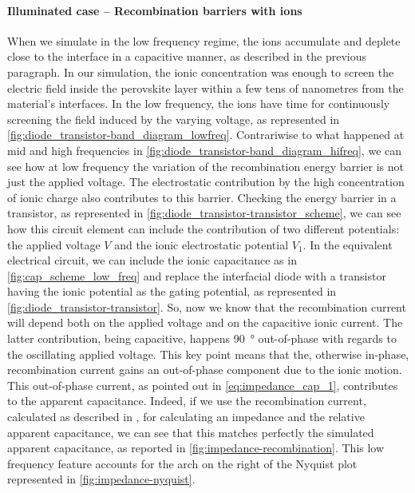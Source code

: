 	\paragraph{Illuminated case -- Recombination barriers with ions}
When we simulate in the low frequency regime, the ions accumulate and deplete close to the interface in a capacitive manner, as described in the previous paragraph.
In our simulation, the ionic concentration was enough to screen the electric field inside the perovskite layer within a few tens of nanometres from the material's interfaces.
In the low frequency, the ions have time for continuously screening the field induced by the varying voltage, as represented in \cref{fig:diode_transistor-band_diagram_lowfreq}.
Contrariwise to what happened at mid and high frequencies in \cref{fig:diode_transistor-band_diagram_hifreq}, we can see how at low frequency the variation of the recombination energy barrier is not just the applied voltage.
The electrostatic contribution by the high concentration of ionic charge also contributes to this barrier.
Checking the energy barrier in a transistor, as represented in \cref{fig:diode_transistor-transistor_scheme}, we can see how this circuit element can include the contribution of two different potentials: the applied voltage $V$ and the ionic electrostatic potential $V_1$.
In the equivalent electrical circuit, we can include the ionic capacitance as in \cref{fig:cap_scheme_low_freq} and replace the interfacial diode with a transistor having the ionic potential as the gating potential, as represented in \cref{fig:diode_transistor-transistor}.
So, now we know that the recombination current will depend both on the applied voltage and on the capacitive ionic current.
The latter contribution, being capacitive, happens \SI{90}{\degree} out\hyp{}of\hyp{}phase with regards to the oscillating applied voltage.
This key point means that the, otherwise in-phase, recombination current gains an out\hyp{}of\hyp{}phase component due to the ionic motion.
This out\hyp{}of\hyp{}phase current, as pointed out in \cref{eq:impedance_cap_1}, contributes to the apparent capacitance.
Indeed, if we use the recombination current, calculated as described in , for calculating an impedance and the relative apparent capacitance, we can see that this matches perfectly the simulated apparent capacitance, as reported in \cref{fig:impedance-recombination}.
This low frequency feature accounts for the arch on the right of the Nyquist plot represented in \cref{fig:impedance-nyquist}.

